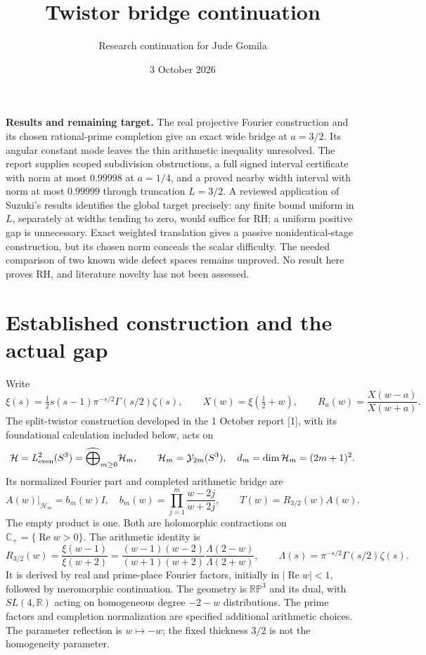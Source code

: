 \documentclass[11pt,letterpaper]{article}
\title{Twistor bridge continuation}
\author{Research continuation for Jude Gomila}
\date{3 October 2026}
\newcommand{\HH}{\mathcal H}
\newcommand{\CP}{\mathbb C_+}
\newcommand{\Rea}{\operatorname{Re}}
\begin{document}
\maketitle
\vspace{-1em}
\noindent\textbf{Results and remaining target.} The real projective Fourier construction and its chosen rational-prime completion give an exact wide bridge at $a=3/2$. Its angular constant mode leaves the thin arithmetic inequality unresolved. The report supplies scoped subdivision obstructions, a full signed interval certificate with norm at most $0.99998$ at $a=1/4$, and a proved nearby width interval with norm at most $0.99999$ through truncation $L=3/2$. A reviewed application of Suzuki's results identifies the global target precisely: any finite bound uniform in $L$, separately at widths tending to zero, would suffice for RH; a uniform positive gap is unnecessary. Exact weighted translation gives a passive nonidentical-stage construction, but its chosen norm conceals the scalar difficulty. The needed comparison of two known wide defect spaces remains unproved. No result here proves RH, and literature novelty has not been assessed.

\section{Established construction and the actual gap}
Write
\[
 \xi(s)=\tfrac12s(s-1)\pi^{-s/2}\Gamma(s/2)\zeta(s),\qquad
 X(w)=\xi(\tfrac12+w),\qquad R_a(w)=\frac{X(w-a)}{X(w+a)}.
\]
The split-twistor construction developed in the 1 October report [1], with its foundational calculation included below, acts on
\[
 \HH=L^2_{\rm even}(S^3)=\widehat{\bigoplus}_{m\geq0}\HH_m,
 \qquad \HH_m=\mathcal Y_{2m}(S^3),\quad d_m=\dim\HH_m=(2m+1)^2.
\]
Its normalized Fourier part and completed arithmetic bridge are
\begin{equation}\label{eq:model}
 A(w)|_{\HH_m}=b_m(w)I,\quad
 b_m(w)=\prod_{j=1}^{m}\frac{w-2j}{w+2j},\qquad
 T(w)=R_{3/2}(w)A(w).
\end{equation}
The empty product is one. Both are holomorphic contractions on $\CP=\{\Rea w>0\}$. The arithmetic identity is
\[
 R_{3/2}(w)=\frac{\xi(w-1)}{\xi(w+2)}
 =\frac{(w-1)(w-2)}{(w+1)(w+2)}
 \frac{\Lambda(2-w)}{\Lambda(2+w)},\qquad \Lambda(s)=\pi^{-s/2}\Gamma(s/2)\zeta(s).
\]
It is derived by real and prime-place Fourier factors, initially in $|\Rea w|<1$, followed by meromorphic continuation. The geometry is $\mathbb{RP}^3$ and its dual, with $SL(4,\mathbb R)$ acting on homogeneous degree $-2-w$ distributions. The prime factors and completion normalization are specified additional arithmetic choices. The parameter reflection is $w\mapsto-w$; the fixed thickness $3/2$ is not the homogeneity parameter.
\end{document}
